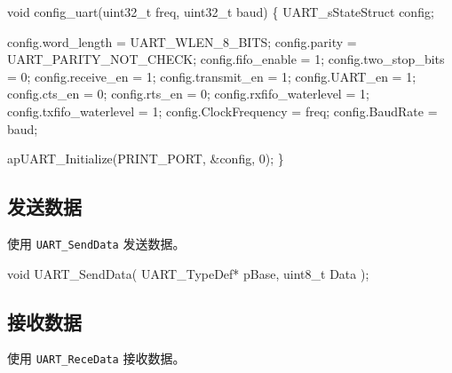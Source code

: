 \documentclass[
  12pt,
]{book}
\newenvironment{Shaded}{\begin{snugshade}}{\end{snugshade}}
\newcommand{\DataTypeTok}[1]{\textcolor[rgb]{0.13,0.29,0.53}{#1}}
\newcommand{\DecValTok}[1]{\textcolor[rgb]{0.00,0.00,0.81}{#1}}
\newcommand{\NormalTok}[1]{#1}
\begin{document}
\begin{Shaded}
\begin{Highlighting}[]
\DataTypeTok{void}\NormalTok{ config_uart(}\DataTypeTok{uint32_t}\NormalTok{ freq, }\DataTypeTok{uint32_t}\NormalTok{ baud)}
\NormalTok{\{}
\NormalTok{    UART_sStateStruct config;}

\NormalTok{    config.word_length       = UART_WLEN_8_BITS;}
\NormalTok{    config.parity            = UART_PARITY_NOT_CHECK;}
\NormalTok{    config.fifo_enable       = }\DecValTok{1}\NormalTok{;}
\NormalTok{    config.two_stop_bits     = }\DecValTok{0}\NormalTok{;}
\NormalTok{    config.receive_en        = }\DecValTok{1}\NormalTok{;}
\NormalTok{    config.transmit_en       = }\DecValTok{1}\NormalTok{;}
\NormalTok{    config.UART_en           = }\DecValTok{1}\NormalTok{;}
\NormalTok{    config.cts_en            = }\DecValTok{0}\NormalTok{;}
\NormalTok{    config.rts_en            = }\DecValTok{0}\NormalTok{;}
\NormalTok{    config.rxfifo_waterlevel = }\DecValTok{1}\NormalTok{;}
\NormalTok{    config.txfifo_waterlevel = }\DecValTok{1}\NormalTok{;}
\NormalTok{    config.ClockFrequency    = freq;}
\NormalTok{    config.BaudRate          = baud;}

\NormalTok{    apUART_Initialize(PRINT_PORT, &config, }\DecValTok{0}\NormalTok{);}
\NormalTok{\}}
\end{Highlighting}
\end{Shaded}

\hypertarget{ux53d1ux9001ux6570ux636e-1}{%
\subsection{发送数据}\label{ux53d1ux9001ux6570ux636e-1}}

使用 \texttt{UART\_SendData} 发送数据。

\begin{Shaded}
\begin{Highlighting}[]
\DataTypeTok{void}\NormalTok{ UART_SendData(}
\NormalTok{  UART_TypeDef* pBase, }
  \DataTypeTok{uint8_t}\NormalTok{ Data}
\NormalTok{  );}
\end{Highlighting}
\end{Shaded}

\hypertarget{ux63a5ux6536ux6570ux636e-1}{%
\subsection{接收数据}\label{ux63a5ux6536ux6570ux636e-1}}

使用 \texttt{UART\_ReceData} 接收数据。
\end{document}
